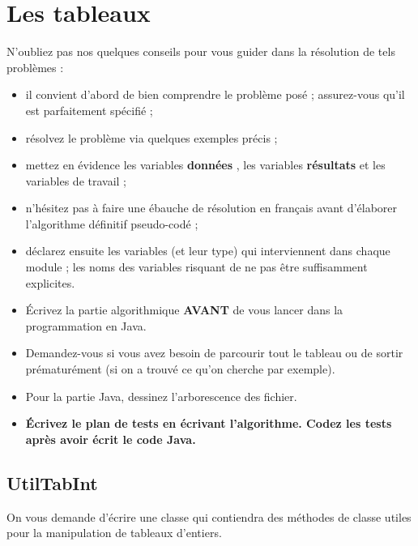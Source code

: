 \documentclass[11pt,a4paper]{article}
\begin{document}
            \section{Les tableaux}
      N'oubliez pas nos quelques conseils pour vous guider dans la r\'esolution de tels probl\`emes :
      
					\begin{itemize}
				
			\item il convient d'abord de bien comprendre le probl\`eme pos\'e ; assurez-vous qu'il est parfaitement sp\'ecifi\'e ;
			\item r\'esolvez le probl\`eme via quelques exemples pr\'ecis ;
			\item mettez en \'evidence les variables \textbf{\guillemotleft  donn\'ees \guillemotright }, les variables \textbf{\guillemotleft  r\'esultats \guillemotright } et les variables de travail ;
			\item n'h\'esitez pas \`a faire une \'ebauche de r\'esolution en fran\c cais avant d'\'elaborer l'algorithme d\'efinitif pseudo-cod\'e ;
			\item d\'eclarez ensuite les variables (et leur type) qui interviennent dans chaque module ; les noms des variables risquant de ne pas \^etre suffisamment explicites.
			\item \'Ecrivez la partie algorithmique \textbf{AVANT} de vous lancer dans la programmation en Java.
			\item Demandez-vous si vous avez besoin de parcourir tout le tableau ou de sortir pr\'ematur\'ement (si on a trouv\'e ce qu'on cherche par exemple).
			\item Pour la partie Java, dessinez l'arborescence des fichier. 
			\item \textbf{\'Ecrivez le plan de tests en \'ecrivant l'algorithme. Codez les tests apr\`es avoir \'ecrit le code Java.}
					\end{itemize}
				
            \par
        \subsection{UtilTabInt}
					On vous demande d'\'ecrire une classe
					\verb@UtilTabInt@
					qui contiendra des m\'ethodes de classe utiles 
					pour la manipulation de tableaux d'entiers.
				
            \par
        
\end{document}
